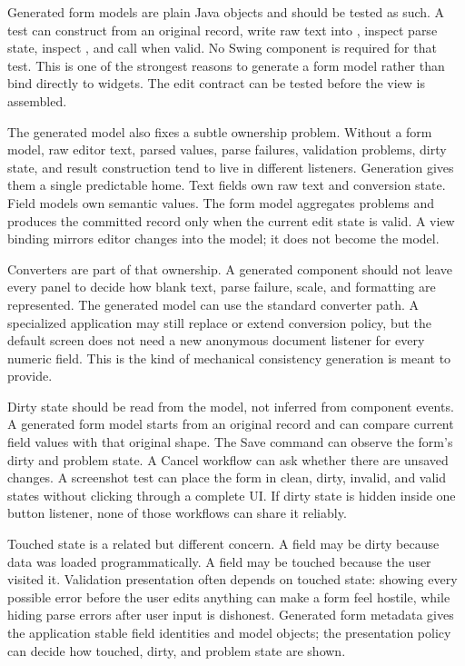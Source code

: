 Generated form models are plain Java objects and should be tested as such. A
test can construct  from an original record, write
raw text into , inspect parse state, inspect
, and call  when valid. No Swing component
is required for that test. This is one of the strongest reasons to generate a
form model rather than bind directly to widgets. The edit contract can be
tested before the view is assembled.

The generated model also fixes a subtle ownership problem. Without a form
model, raw editor text, parsed values, parse failures, validation problems,
dirty state, and result construction tend to live in different listeners.
Generation gives them a single predictable home. Text fields own raw text and
conversion state. Field models own semantic values. The form model aggregates
problems and produces the committed record only when the current edit state is
valid. A view binding mirrors editor changes into the model; it does not
become the model.

Converters are part of that ownership. A generated 
 component should not leave every panel to decide how blank
text, parse failure, scale, and formatting are represented. The generated
model can use the standard converter path. A specialized application may still
replace or extend conversion policy, but the default screen does not need a
new anonymous document listener for every numeric field. This is the kind of
mechanical consistency generation is meant to provide.

Dirty state should be read from the model, not inferred from component events.
A generated form model starts from an original record and can compare current
field values with that original shape. The Save command can observe the form's
dirty and problem state. A Cancel workflow can ask whether there are unsaved
changes. A screenshot test can place the form in clean, dirty, invalid, and
valid states without clicking through a complete UI. If dirty state is hidden
inside one button listener, none of those workflows can share it reliably.

Touched state is a related but different concern. A field may be dirty because
data was loaded programmatically. A field may be touched because the user
visited it. Validation presentation often depends on touched state: showing
every possible error before the user edits anything can make a form feel
hostile, while hiding parse errors after user input is dishonest. Generated
form metadata gives the application stable field identities and model objects;
the presentation policy can decide how touched, dirty, and problem state are
shown.

